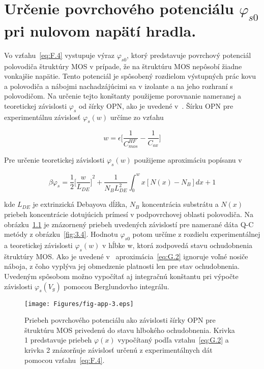 
\chapter{Určenie povrchového potenciálu $\varphi_{s0}$ pri nulovom napätí hradla.}\label{app:AppendixG}

Vo vzťahu~\ref{eq:F.4} vystupuje výraz $\varphi_{s0}$, ktorý
predstavuje povrchový potenciál polovodiča štruktúry MOS v prípade, že
na štruktúru MOS nepôsobí žiadne vonkajšie napätie.  Tento potenciál
je spôsobený rozdielom výstupných prác kovu a polovodiča a nábojmi
nachadzájúcimi sa v izolante a na jeho rozhraní s polovodičom. Na
určenie tejto konštanty použijeme porovnanie nameranej a teoretickej
závislosti $\varphi_{s}$ od šírky OPN, ako je uvedené
v~\cite{App.3}. Šírku OPN pre experimentálnu závislosť
$\varphi_{s}(w)$ určíme zo vzťahu

\begin{equation}\label{eq:G.1}
  w = \epsilon \bigg[\frac{1}{C_{mos}^{HF}} - \frac{1}{C_{ox}}\bigg]
\end{equation}

Pre určenie teoretickej závislosti $\varphi_{s}(w)$ použijeme
aproximáciu popísanu v~\cite{App.5}

\begin{equation}\label{eq:G.2}
  \beta \varphi_{s} = \frac{1}{2} {\bigg[\frac{w}{L_{DE}}\bigg]}^2 + \frac{1}{N_{B}L_{DE}^{2}} \int_{0}^{w}x[N(x)-N_{B}]dx + 1
\end{equation}

kde $L_{DE}$ je extrinzická Debayova dĺžka, $N_{B}$ koncentrácia
substrátu a $N(x)$ priebeh koncentrácie dotujúcich prímesí v
podpovrchovej oblasti polovodiča. Na obrázku~\ref{fig:App.3} je
znázornený priebeh uvedených závislostí pre namerané dáta Q-C metódy z
obrázku~\ref{fig:3.4}. Hodnotu $\varphi_{s0}$ potom určíme z rozdielu
experimentálnej a teoretickej závislosti $\varphi_{s}(w)$ v hĺbke w,
ktorá zodpovedá stavu ochudobnenia štruktúry MOS\@. Ako je uvedené
v~\cite{App.3} aproximácia~\ref{eq:G.2} ignoruje voľné nosiče náboja,
z čoho vyplýva jej obmedzenie platnosti len pre stav ochudobnenia.
Uvedeným spôsobom možno vypočítať aj integračnú konštantu pri výpočte
závislosti $\varphi_{s}(V_{g})$ pomocou Berglundovho integrálu.

\begin{figure}[h!]\centering
\texttt{[image: Figures/fig-app-3.eps]}
\caption[Priebeh povrchového potenciálu ako závislosti šírky OPN pre
  štruktúru MOS privedenú do stavu hlbokého ochudobnenia]{Priebeh
  povrchového potenciálu ako závislosti šírky OPN pre štruktúru MOS
  privedenú do stavu hlbokého ochudobnenia.  Krivka 1 predstavuje
  priebeh $\varphi(x)$ vypočítaný podľa vztahu~\ref{eq:G.2} a krivka 2
  znázorňuje závislosť určenú z experimentálnych dát pomocou
  vzťahu~\ref{eq:F.4}.}\label{fig:App.3}
\end{figure}
